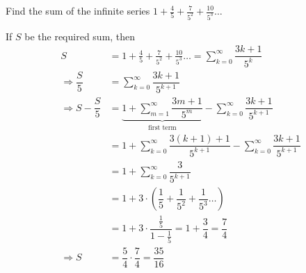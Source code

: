 
%
%
%
%
% 
% 

\question[4] Find the sum of the infinite series $1 + \frac{4}{5} + \frac{7}{5^2} + \frac{10}{5^3}\ldots$


\ifprintanswers
\fi 

\begin{solution}[\halfpage]
	If $S$ be the required sum, then
	\begin{align}
		S &= 1 + \frac{4}{5} + \frac{7}{5^2} + \frac{10}{5^3}\ldots = \sum_{k=0}^{\infty}\dfrac{3k+1}{5^k} \\
		\Rightarrow\dfrac{S}{5} &= \sum_{k=0}^{\infty}\dfrac{3k+1}{5^{k+1}} \\
		\Rightarrow S - \dfrac{S}{5} &= \underbrace{1 + \sum_{m=1}^{\infty}\dfrac{3m+1}{5^m}}
		_{\text{first term}}- \sum_{k=0}^{\infty}\dfrac{3k+1}{5^{k+1}} \\
		&= 1 + \sum_{k=0}^{\infty}\dfrac{3(k+1)+1}{5^{k+1}}-\sum_{k=0}^{\infty}\dfrac{3k+1}{5^{k+1}} \\
		&= 1 + \sum_{k=0}^{\infty}\dfrac{3}{5^{k+1}} \\
		&= 1 + 3\cdot\left( \dfrac{1}{5} + \dfrac{1}{5^2} + \dfrac{1}{5^3}\ldots \right) \\
		&= 1 + 3\cdot\dfrac{\frac{1}{5}}{1-\frac{1}{5}} = 1 + \dfrac{3}{4} = \dfrac{7}{4} \\
		\Rightarrow S &= \dfrac{5}{4}\cdot\dfrac{7}{4} = \dfrac{35}{16}
	\end{align}
\end{solution}
